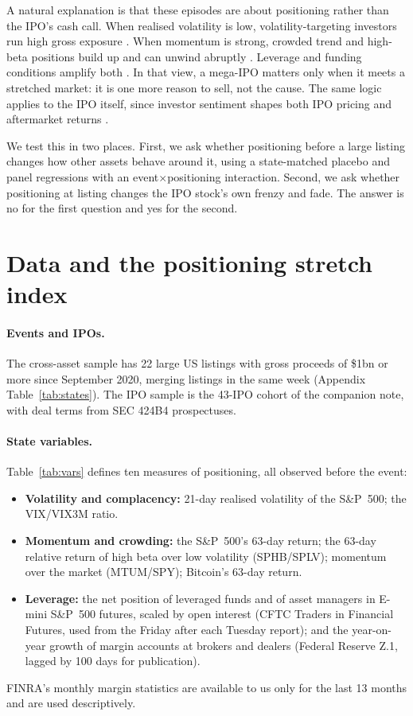 \documentclass[11pt]{article}
\begin{document}
A natural explanation is that these episodes are about positioning rather than the IPO's cash call. When realised volatility is low, volatility-targeting investors run high gross exposure \citep{moreira2017}. When momentum is strong, crowded trend and high-beta positions build up and can unwind abruptly \citep{daniel2016}. Leverage and funding conditions amplify both \citep{brunnermeier2009,adrian2010}. In that view, a mega-IPO matters only when it meets a stretched market: it is one more reason to sell, not the cause. The same logic applies to the IPO itself, since investor sentiment shapes both IPO pricing and aftermarket returns \citep{derrien2005,cornelli2006,ljungqvist2006,baker2006,baker2007}.

We test this in two places. First, we ask whether positioning before a large listing changes how other assets behave around it, using a state-matched placebo and panel regressions with an event$\times$positioning interaction. Second, we ask whether positioning at listing changes the IPO stock's own frenzy and fade. The answer is no for the first question and yes for the second.

\section{Data and the positioning stretch index}

\paragraph{Events and IPOs.} The cross-asset sample has 22 large US listings with gross proceeds of \$1bn or more since September 2020, merging listings in the same week (Appendix Table~\ref{tab:states}). The IPO sample is the 43-IPO cohort of the companion note, with deal terms from SEC 424B4 prospectuses.

\paragraph{State variables.} Table~\ref{tab:vars} defines ten measures of positioning, all observed before the event:
\begin{itemize}
\item \textbf{Volatility and complacency:} 21-day realised volatility of the S\&P~500; the VIX/VIX3M ratio.
\item \textbf{Momentum and crowding:} the S\&P~500's 63-day return; the 63-day relative return of high beta over low volatility (SPHB/SPLV); momentum over the market (MTUM/SPY); Bitcoin's 63-day return.
\item \textbf{Leverage:} the net position of leveraged funds and of asset managers in E-mini S\&P~500 futures, scaled by open interest (CFTC Traders in Financial Futures, used from the Friday after each Tuesday report); and the year-on-year growth of margin accounts at brokers and dealers (Federal Reserve Z.1, lagged by 100 days for publication).
\end{itemize}
FINRA's monthly margin statistics are available to us only for the last 13 months and are used descriptively.
\end{document}
